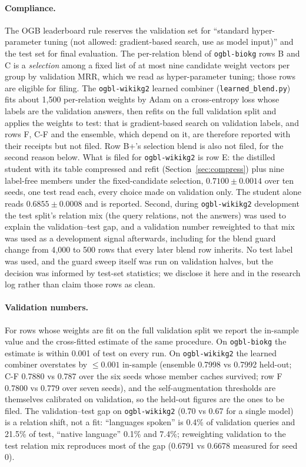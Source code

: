 \documentclass[11pt,a4paper]{article}
\begin{document}
\paragraph{Compliance.}
The OGB leaderboard rule reserves the validation set for ``standard
hyper-parameter tuning (not allowed: gradient-based search, use as model
input)'' and the test set for final evaluation. The per-relation blend
of \texttt{ogbl-biokg} rows B and C is a \emph{selection} among a fixed
list of at most nine candidate weight vectors per group by validation
MRR, which we read as hyper-parameter tuning; those rows are eligible for filing. The
\texttt{ogbl-wikikg2} learned combiner (\texttt{learned\_blend.py}) fits
about 1{,}500 per-relation weights by Adam on a cross-entropy loss whose
labels are the validation answers, then refits on the full validation
split and applies the weights to test: that is gradient-based search on
validation labels, and rows F, C-F and the ensemble, which depend on it,
are therefore reported with their receipts but not filed. Row B+'s
selection blend is also not filed, for the second reason below. What is
filed for \texttt{ogbl-wikikg2} is row E: the distilled student with its
table compressed and refit (Section~\ref{sec:compress}) plus nine label-free
members under the fixed-candidate selection, $0.7100\pm0.0014$ over ten
seeds, one test read each, every choice made on validation only. The
student alone reads $0.6855\pm0.0008$ and is reported. Second, during \texttt{ogbl-wikikg2}
development the test split's relation mix (the query relations, not the
answers) was used to explain the validation--test gap, and a
validation number reweighted to that mix was used as a development
signal afterwards, including for the blend guard change from 4{,}000 to
500 rows that every later blend row inherits. No test label was used,
and the guard sweep itself was run on validation halves, but the
decision was informed by test-set statistics; we disclose it here and
in the research log rather than claim those rows as clean.

\paragraph{Validation numbers.}
For rows whose weights are fit on the full validation split we report the
in-sample value and the cross-fitted estimate of the same procedure. On
\texttt{ogbl-biokg} the estimate is within 0.001 of test on every run. On
\texttt{ogbl-wikikg2} the learned combiner overstates by $\le0.001$
in-sample (ensemble 0.7998 vs 0.7992 held-out; C-F 0.7880 vs 0.787 over
the six seeds whose member caches survived; row F 0.7800 vs 0.779 over
seven seeds), and
the self-augmentation thresholds are themselves calibrated on validation,
so the held-out figures are the ones to be filed. The validation--test gap on
\texttt{ogbl-wikikg2} (0.70 vs 0.67 for a single model) is a relation
shift, not a fit: ``languages spoken'' is 0.4\% of validation queries and
21.5\% of test, ``native language'' 0.1\% and 7.4\%; reweighting
validation to the test relation mix reproduces most of the gap (0.6791
vs 0.6678 measured for seed 0).
\end{document}
